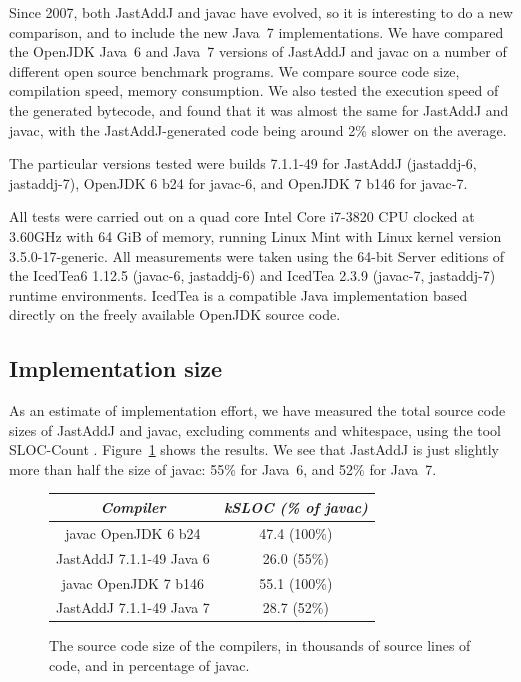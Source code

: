 {Since 2007, both JastAddJ and javac have evolved, so it is interesting to do a
new comparison, and to include the new Java~7 implementations. We have compared
the OpenJDK Java~6 and Java~7 versions of JastAddJ and javac on a number of
different open source benchmark programs. We compare source code size,
compilation speed, memory consumption. We also tested the execution speed of
the generated bytecode, and found that it was almost the same for JastAddJ and
javac, with the JastAddJ-generated code being around 2\% slower on the average. 

The particular versions tested were
builds 7.1.1-49 for JastAddJ (jastaddj-6, jastaddj-7), OpenJDK 6 b24 for
javac-6, and OpenJDK 7 b146 for javac-7.

All tests were carried out on a quad core Intel Core i7-3820 CPU clocked at
3.60GHz with 64 GiB of memory, running Linux Mint with Linux kernel version
3.5.0-17-generic. All measurements were taken using the 64-bit Server editions
of the IcedTea6 1.12.5 (javac-6, jastaddj-6) and IcedTea 2.3.9 (javac-7,
jastaddj-7) runtime environments.  IcedTea is a compatible Java implementation
based directly on the freely available OpenJDK source code.

\subsection{Implementation size}

As an estimate of implementation effort, we have measured the total source code
sizes of JastAddJ and javac, excluding comments and whitespace, using the
tool SLOC-Count \cite{sloccount}. Figure~\ref{ImplementationSize} shows the
results. We see that JastAddJ is just slightly more than half the size of javac: 55\% for Java~6,
and 52\% for Java~7.



\begin{figure}[h]
\center
\small
\begin{tabular}{| c | c |}
\hline
\emph{Compiler} & \emph{kSLOC (\% of javac)}\\
\hline
javac OpenJDK 6 b24 & 47.4 (100\%)\\
JastAddJ 7.1.1-49 Java 6& 26.0 (55\%)\\
\hline
javac OpenJDK 7 b146 & 55.1 (100\%)\\
JastAddJ 7.1.1-49 Java 7 & 28.7 (52\%)\\
\hline
\end{tabular}
\caption{The source code size of the compilers, in thousands of source lines of code, and in percentage of javac.}
\label{ImplementationSize}
\end{figure}

}

